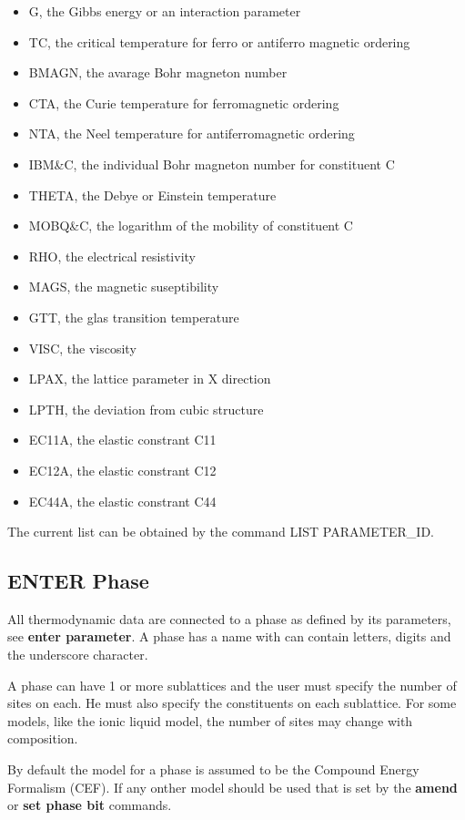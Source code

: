 \documentclass[12pt]{article}
\begin{document}
\begin{itemize}
\item G, the Gibbs energy or an interaction parameter
\item TC, the critical temperature for ferro or antiferro magnetic ordering
\item BMAGN, the avarage Bohr magneton number
\item CTA, the Curie temperature for ferromagnetic ordering
\item NTA, the Neel temperature for antiferromagnetic ordering
\item IBM\&C, the individual Bohr magneton number for constituent C
\item THETA, the Debye or Einstein temperature
\item MOBQ\&C, the logarithm of the mobility of constituent C
\item RHO, the electrical resistivity
\item MAGS, the magnetic suseptibility
\item GTT, the glas transition temperature
\item VISC, the viscosity
\item LPAX, the lattice parameter in X direction
\item LPTH, the deviation from cubic structure
\item EC11A, the elastic constrant C11
\item EC12A, the elastic constrant C12
\item EC44A, the elastic constrant C44
\end{itemize}

The current list can be obtained by the command LIST PARAMETER\_ID.

\subsection{ENTER Phase}

All thermodynamic data are connected to a phase as defined by its
parameters, see {\bf enter parameter}.  A phase has a name with can
contain letters, digits and the underscore character.

A phase can have 1 or more sublattices and the user must specify the
number of sites on each.  He must also specify the constituents on
each sublattice.  For some models, like the ionic liquid model, the
number of sites may change with composition.

By default the model for a phase is assumed to be the Compound Energy
Formalism (CEF).  If any onther model should be used that is set by
the {\bf amend} or {\bf set phase bit} commands.
\end{document}
